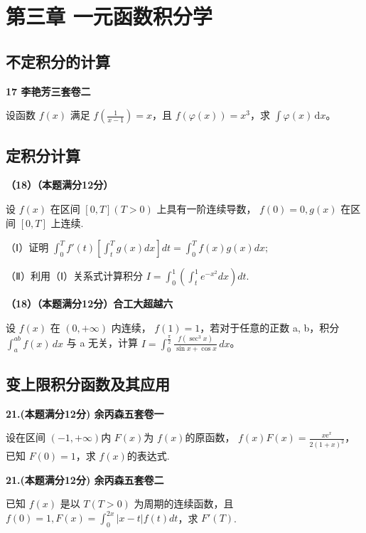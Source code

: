 \documentclass[a4paper,12pt]{article}
\begin{document}
\section{第三章 一元函数积分学}

\subsection{不定积分的计算}

\textbf{17 李艳芳三套卷二}

设函数 $f(x)$ 满足 $f\left(\frac{1}{x-1}\right) = x$，且 $f(\varphi(x)) = x^3$，求 $\int\varphi(x) \, \mathrm{d}x$。

\subsection{定积分计算}

\textbf{（18）（本题满分12分）}

设 $f(x)$ 在区间 $[0,T](T>0)$ 上具有一阶连续导数， $f(0)=0,g(x)$ 在区间 $[0,T]$ 上连续.

（Ⅰ）证明 $\int_{0}^{T}f'(t)\left[\int_{t}^{T}g(x)dx\right]dt=\int_{0}^{T}f(x)g(x)dx;$

（Ⅱ）利用（Ⅰ）关系式计算积分 $I=\int_{0}^{1}\left(\int_{t}^{1}e^{-x^{2}}dx\right)dt.$

\vspace{0.5cm}

\textbf{（18）（本题满分12分）合工大超越六}

设 $f(x)$ 在 $(0, +\infty)$ 内连续， $f(1) = 1$，若对于任意的正数 a, b，积分 $\int_{a}^{ab} f(x) \, dx$ 与 a 无关，计算 $I = \int_{0}^{\frac{\pi}{2}} \frac{f(\sec^{3}x)}{\sin x + \cos x} \, dx$。

\subsection{变上限积分函数及其应用}

\textbf{21.(本题满分12分) 余丙森五套卷一}

设在区间 $(-1,+\infty)$内 $F(x)$为 $f(x)$的原函数， $f(x)F(x)=\frac{x\mathrm{e}^{x}}{2(1+x)^{2}}$，已知 $F(0)=1$，求 $f(x)$的表达式.

\vspace{0.5cm}

\textbf{21.(本题满分12分) 余丙森五套卷二}

已知 $f(x)$ 是以 $T(T>0)$ 为周期的连续函数，且 $f(0)=1, F(x)=\int_{0}^{2x} |x-t| f(t) dt$，求 $F'(T)$.
\end{document}
